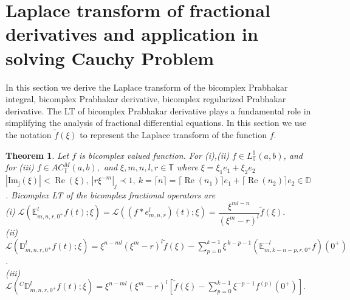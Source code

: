\documentclass[a4paper,12pt]{article}
\newtheorem{theorem}{Theorem}[section]
\theoremstyle{remark}
\begin{document}
\section{Laplace transform of fractional derivatives and application in solving Cauchy Problem } 
In this section we derive the Laplace transform of the bicomplex Prabhakar  integral, bicomplex Prabhakar  derivative, bicomplex regularized Prabhakar  derivative. The LT of  bicomplex Prabhakar derivative plays a fundamental role in simplifying the analysis of fractional differential equations.  In this section we use  the notation $\tilde{f}(\xi)$ to represent the Laplace transform of the function $f$.   
\begin{theorem}\label{th:lt   p int}
Let $f$ is  bicomplex valued function. For (i),(ii)  $f\in L_{\mathbb{T}}^1(a,b)$, and for (iii)  $f\in AC_\mathbb{T}^M(a,b),$	and $\xi,m,n,l,r \in \mathds{T} $ where $\xi=\xi_1e_1+\xi_2e_2$ $|\operatorname{Im_j}(\xi)|<\operatorname{Re}(\xi),~|r \xi^{-m}|_j\prec1,~ k=\lceil n \rceil=\lceil\operatorname{Re} (n_1)\rceil e_1+\lceil \operatorname{Re}(n_2)\rceil e_2\in \mathbb{D}$. Bicomplex
	LT of  the bicomplex fractional operators are    \\ 
 
(i) $\mathcal{L}\left(\mathbb{E}_{m,n,r,0^+}^lf(t) ;\xi\right)=\mathcal{L}\left( (f*e_{m,n,r}^l)(t) ;\xi\right) =\dfrac{\xi^{ml-n}}{(\xi^{m}-r)^{l}}\tilde{f}(\xi).$\\

(ii)$\mathcal{L}\left( \mathbb{D}^{l}_{m,n,r,0^+} f(t) ;\xi\right)
= \xi^{n - m l} \left(\xi^{m} - r\right)^{l} \tilde{f}(\xi)
- \sum_{p=0}^{k-1} \xi^{\,k-p-1}
\left( \mathbb{E}^{-l}_{m,k-n-p,r,0^+} f \right)(0^{+})$.  \\



(iii)	$\mathcal{L}\left( 	^C\mathbb{D}_{m,n,r,0^+}^l f(t);\xi\right)= \xi^{n-ml}\left(\xi^{m}-r\right)^{l}
	\left[
	\tilde{f}(\xi) - \sum_{p=0}^{k-1} \xi^{-p-1} f^{(p)}(0^{+})
	\right].$

	
    \end{theorem}
    
\end{document}
